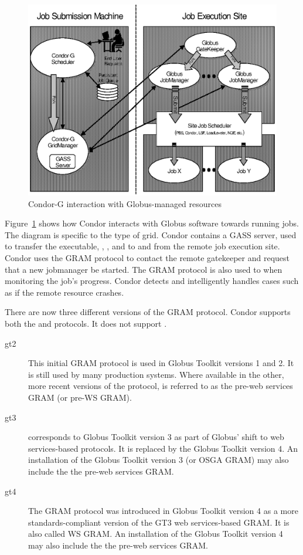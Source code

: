 \begin{figure}[hbt]
\centering
\includegraphics{grids/gfig1.eps}
\caption{\label{fig:condorg}Condor-G interaction with Globus-managed resources}
\end{figure}

Figure~\ref{fig:condorg} shows how Condor interacts with Globus software
towards running jobs.
The diagram is specific to the  type of grid.
Condor contains a GASS server, used to transfer the executable,
, , and  to and from
the remote job execution site.
Condor uses the GRAM protocol to contact the remote gatekeeper
and request that a new jobmanager be started.
The GRAM protocol is also used to when monitoring the job's progress.
Condor detects and intelligently handles cases
such as if the remote resource crashes.

There are now three different versions of the GRAM protocol.
Condor supports both the  and 
protocols.  It does not support .
\begin{description}
\item[gt2]
This initial GRAM protocol is used in Globus Toolkit versions 1 and 2.
It is still used by many production systems.
Where available in the other, more recent versions of the protocol,
 is referred to as the pre-web services GRAM 
(or pre-WS GRAM).
\item[gt3]
 corresponds to
Globus Toolkit version 3 as part of
Globus' shift to web services-based protocols.
It is replaced by  the Globus Toolkit version 4.
An installation of the Globus Toolkit version 3 
(or OSGA GRAM) may also
include the the pre-web services GRAM.
\item[gt4]
The GRAM protocol was introduced in Globus Toolkit version 4 as a more
standards-compliant version of the GT3 web services-based GRAM.
It is also called WS GRAM.
An installation of the Globus Toolkit version 4 may also
include the the pre-web services GRAM.
\end{description}

